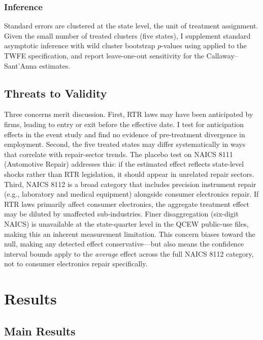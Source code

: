 \documentclass[12pt]{article}
\begin{document}
\subsubsection*{Inference} Standard errors are clustered at the state level, the unit of treatment assignment. Given the small number of treated clusters (five states), I supplement standard asymptotic inference with wild cluster bootstrap $p$-values using \citet{cameron2008bootstrap} applied to the TWFE specification, and report leave-one-out sensitivity for the Callaway--Sant'Anna estimates.

\subsection{Threats to Validity}

Three concerns merit discussion. First, RTR laws may have been anticipated by firms, leading to entry or exit before the effective date. I test for anticipation effects in the event study and find no evidence of pre-treatment divergence in employment. Second, the five treated states may differ systematically in ways that correlate with repair-sector trends. The placebo test on NAICS 8111 (Automotive Repair) addresses this: if the estimated effect reflects state-level shocks rather than RTR legislation, it should appear in unrelated repair sectors. Third, NAICS 8112 is a broad category that includes precision instrument repair (e.g., laboratory and medical equipment) alongside consumer electronics repair. If RTR laws primarily affect consumer electronics, the aggregate treatment effect may be diluted by unaffected sub-industries. Finer disaggregation (six-digit NAICS) is unavailable at the state-quarter level in the QCEW public-use files, making this an inherent measurement limitation. This concern biases toward the null, making any detected effect conservative---but also means the confidence interval bounds apply to the \emph{average} effect across the full NAICS 8112 category, not to consumer electronics repair specifically.

\section{Results}

\subsection{Main Results}


\end{document}
